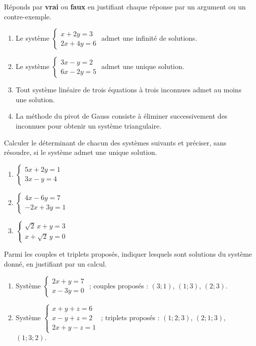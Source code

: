 \documentclass[11pt]{article}
\begin{document}
\begin{exercice}
Réponds par \textbf{vrai} ou \textbf{faux} en justifiant chaque réponse par un argument ou un contre-exemple.
\begin{enumerate}
\item Le système $\begin{cases} x + 2y = 3 \\ 2x + 4y = 6 \end{cases}$ admet une infinité de solutions.
\item Le système $\begin{cases} 3x - y = 2 \\ 6x - 2y = 5 \end{cases}$ admet une unique solution.
\item Tout système linéaire de trois équations à trois inconnues admet au moins une solution.
\item La méthode du pivot de Gauss consiste à éliminer successivement des inconnues pour obtenir un système triangulaire.
\end{enumerate}
\end{exercice}

\begin{exercice}
Calculer le déterminant de chacun des systèmes suivants et préciser, sans résoudre, si le système admet une unique solution.
\begin{enumerate}
\item $\begin{cases} 5x + 2y = 1 \\ 3x - y = 4 \end{cases}$ \qquad \item $\begin{cases} 4x - 6y = 7 \\ -2x + 3y = 1 \end{cases}$ \qquad \item $\begin{cases} \sqrt{2}\,x + y = 3 \\ x + \sqrt{2}\,y = 0 \end{cases}$
\end{enumerate}
\end{exercice}

\begin{exercice}
Parmi les couples et triplets proposés, indiquer lesquels sont solutions du système donné, en justifiant par un calcul.
\begin{enumerate}
\item Système $\begin{cases} 2x + y = 7 \\ x - 3y = 0 \end{cases}$ ; couples proposés : $(3 ; 1)$, $(1 ; 3)$, $(2 ; 3)$.
\item Système $\begin{cases} x + y + z = 6 \\ x - y + z = 2 \\ 2x + y - z = 1 \end{cases}$ ; triplets proposés : $(1 ; 2 ; 3)$, $(2 ; 1 ; 3)$, $(1 ; 3 ; 2)$.
\end{enumerate}
\end{exercice}
\end{document}
